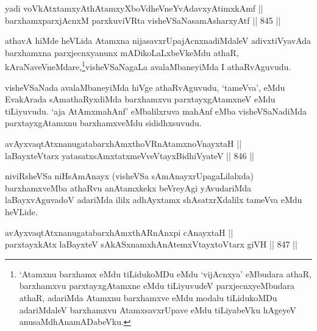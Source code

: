 

\begin{shl}
yadi voVkAtxtamxyAthAtamxyXboVdheVneYvAdavxyAtimxkAmf || \\
barxhamxparxjAcnxM parxkuviVRta visheVSaNasamAsharxyAtf \hfill || 845 ||  
\end{shl}

\begin{artha}
athavA hiMde heVLida Atamxna nijasavxrUpajAcnxnadiMdaleV adivxtiVyavAda barxhamxna parxjecnxyanunx mADikoLaLxbeVkeMdu athaR, kAraNaveVneMdare,\footnote{`Atamxnu barxhamx eMdu tiLidukoMDu eMdu `vijAcnxya' eMbudara athaR, barxhamxvu parxtayxgAtamxne eMdu tiLiyuvudeV parxjecnxyeMbudara athaR, adariMda Atamxnu barxhamxve eMdu modalu tiLidukoMDu adariMdaleV barxhamxvu AtamxsavxrUpave eMdu tiLiyabeVku hAgeyeV anusaMdhAnamADabeVku.}visheVSaNagaLa avalaMbaneyiMda I athaRvAguvudu.
\end{artha}

\begin{artha}
visheVSaNada avalaMbaneyiMda hiVge athaRvAguvudu, `tameVva', eMdu EvakArada sAmathaRyxdiMda barxhamxvu parxtayxgAtamxneV eMdu tiLiyuvudu. `aja AtAmxmahAnf' eMbalilxruva mahAnf eMba visheVSaNadiMda parxtayxgAtamxnu barxhamxveMdu sididhxsuvudu.
\end{artha}


\begin{shl}
avAyxvaqtAtxnanugatabarxhAmxthoVR\s nAtamxnoV\s nayxtaH || \\
laBayxteV\s tarx yatasatxsAmxtatxmeVveVtayxBidhiVyateV \hfill || 846 ||  
\end{shl}

\begin{artha}
niviRsheVSa niHsAmAnayx (visheVSa sAmAnayxrUpagaLilalxda) barxhamxveMba athaRvu anAtamxkekx beVreyAgi yAvudariMda laBayxvAguvadoV adariMda ililx adhAyxtamx shAsatxrXdalilx tameVva eMdu heVLide.
\end{artha}


\begin{shl}
avAyxvaqtAtxnanugatabarxhAmxthARnAnxpi cAnayxtaH || \\
parxtayxkAtx laBayxteV sAkASxnamxhAnAtemxVtayxtoV\s tarx giVH \hfill || 847 ||  
\end{shl}

